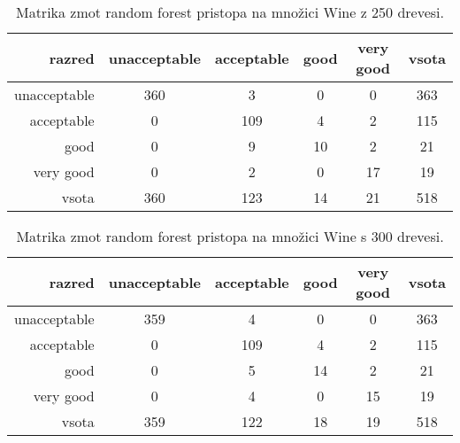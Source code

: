 \begin{table}[H]
    \centering
    \begin{tabular}{||rccccc||}
        \hline
        razred       & unacceptable & acceptable & good & very good & vsota \\ \hline
        unacceptable & 360          & 3          & 0    & 0         & 363   \\ \hline
        acceptable   & 0            & 109        & 4    & 2         & 115   \\ \hline
        good         & 0            & 9          & 10   & 2         & 21    \\ \hline
        very good    & 0            & 2          & 0    & 17        & 19    \\ \hline
        vsota        & 360          & 123        & 14   & 21        & 518   \\ \hline
    \end{tabular}
    \caption{Matrika zmot random forest pristopa na množici Wine z 250 drevesi.}
    \label{tab:rforest_car_cm_2}
\end{table}

\begin{table}[H]
    \centering
    \begin{tabular}{||rccccc||}
        \hline
        razred       & unacceptable & acceptable & good & very good & vsota \\ \hline
        unacceptable & 359          & 4          & 0    & 0         & 363   \\ \hline
        acceptable   & 0            & 109        & 4    & 2         & 115   \\ \hline
        good         & 0            & 5          & 14   & 2         & 21    \\ \hline
        very good    & 0            & 4          & 0    & 15        & 19    \\ \hline
        vsota        & 359          & 122        & 18   & 19        & 518   \\ \hline
    \end{tabular}
    \caption{Matrika zmot random forest pristopa na množici Wine s 300 drevesi.}
    \label{tab:rforest_car_cm_3}
\end{table}

